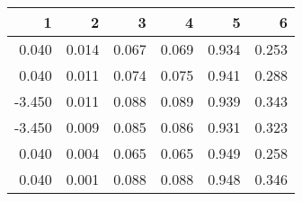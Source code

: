 \begin{table}[ht]
\centering
\begin{tabular}{rrrrrr}
  \hline
1 & 2 & 3 & 4 & 5 & 6 \\ 
  \hline
0.040 & 0.014 & 0.067 & 0.069 & 0.934 & 0.253 \\ 
  0.040 & 0.011 & 0.074 & 0.075 & 0.941 & 0.288 \\ 
  -3.450 & 0.011 & 0.088 & 0.089 & 0.939 & 0.343 \\ 
  -3.450 & 0.009 & 0.085 & 0.086 & 0.931 & 0.323 \\ 
  0.040 & 0.004 & 0.065 & 0.065 & 0.949 & 0.258 \\ 
  0.040 & 0.001 & 0.088 & 0.088 & 0.948 & 0.346 \\ 
   \hline
\end{tabular}
\end{table}

